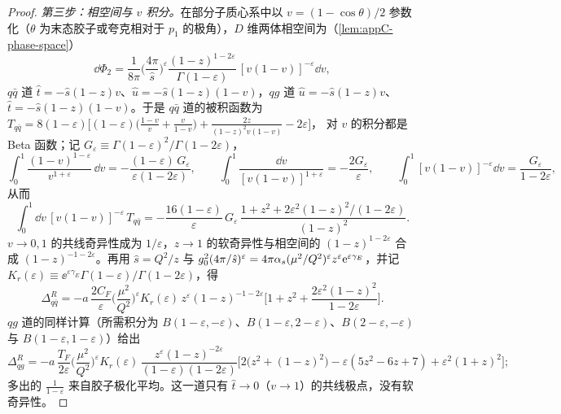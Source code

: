 \begin{proof}
\emph{第三步：相空间与 $v$ 积分。}在部分子质心系中以 $v=(1-\cos\theta)/2$ 参数化（$\theta$ 为末态胶子或夸克相对于 $p_1$ 的极角），$D$ 维两体相空间为（\cref{lem:appC-phase-space}）
\[
\dd\Phi_2=\frac{1}{8\pi}\Big(\frac{4\pi}{\hat s}\Big)^{\varepsilon}\frac{(1-z)^{1-2\varepsilon}}{\Gamma(1-\varepsilon)}\,[v(1-v)]^{-\varepsilon}\dd v,
\]
$q\bar q$ 道 $\hat t=-\hat s(1-z)v$、$\hat u=-\hat s(1-z)(1-v)$，$qg$ 道 $\hat u=-\hat s(1-z)v$、$\hat t=-\hat s(1-z)(1-v)$。于是 $q\bar q$ 道的被积函数为
$T_{q\bar q}=8(1-\varepsilon)\big[(1-\varepsilon)\big(\frac{1-v}{v}+\frac{v}{1-v}\big)+\frac{2z}{(1-z)^2v(1-v)}-2\varepsilon\big]$，
对 $v$ 的积分都是 Beta 函数；记 $G_\varepsilon\equiv\Gamma(1-\varepsilon)^2/\Gamma(1-2\varepsilon)$，
\[
\int_0^1\!\frac{(1-v)^{1-\varepsilon}}{v^{1+\varepsilon}}\,\dd v=-\frac{(1-\varepsilon)\,G_\varepsilon}{\varepsilon(1-2\varepsilon)},\qquad
\int_0^1\!\frac{\dd v}{[v(1-v)]^{1+\varepsilon}}=-\frac{2G_\varepsilon}{\varepsilon},\qquad
\int_0^1\![v(1-v)]^{-\varepsilon}\dd v=\frac{G_\varepsilon}{1-2\varepsilon},
\]
从而
\[
\int_0^1\!\dd v\,[v(1-v)]^{-\varepsilon}\,T_{q\bar q}=-\frac{16(1-\varepsilon)}{\varepsilon}\,G_\varepsilon\,\frac{1+z^2+2\varepsilon^2(1-z)^2/(1-2\varepsilon)}{(1-z)^2}.
\]
$v\to0,1$ 的共线奇异性成为 $1/\varepsilon$，$z\to1$ 的软奇异性与相空间的 $(1-z)^{1-2\varepsilon}$ 合成 $(1-z)^{-1-2\varepsilon}$。再用 $\hat s=Q^2/z$ 与 $g_0^2(4\pi/\hat s)^\varepsilon=4\pi\alpha_s(\mu^2/Q^2)^\varepsilon z^\varepsilon\mathrm{e}^{\varepsilon\gamma_E}$，并记 $K_r(\varepsilon)\equiv\ee^{\varepsilon\gamma_E}\Gamma(1-\varepsilon)/\Gamma(1-2\varepsilon)$，得
\begin{equation}\label{eq:dy-real-qq}
\Delta^R_{q\bar q}=-a\,\frac{2C_F}{\varepsilon}\Big(\frac{\mu^2}{Q^2}\Big)^{\varepsilon}K_r(\varepsilon)\,z^{\varepsilon}(1-z)^{-1-2\varepsilon}\Big[1+z^2+\frac{2\varepsilon^2(1-z)^2}{1-2\varepsilon}\Big].
\end{equation}
$qg$ 道的同样计算（所需积分为 $B(1-\varepsilon,-\varepsilon)$、$B(1-\varepsilon,2-\varepsilon)$、$B(2-\varepsilon,-\varepsilon)$ 与 $B(1-\varepsilon,1-\varepsilon)$）给出
\begin{equation}\label{eq:dy-real-qg}
\Delta^R_{qg}=-a\,\frac{T_F}{2\varepsilon}\Big(\frac{\mu^2}{Q^2}\Big)^{\varepsilon}K_r(\varepsilon)\,\frac{z^{\varepsilon}(1-z)^{-2\varepsilon}}{(1-\varepsilon)(1-2\varepsilon)}\Big[2\big(z^2+(1-z)^2\big)-\varepsilon(5z^2-6z+7)+\varepsilon^2(1+z)^2\Big];
\end{equation}
多出的 $\frac1{1-\varepsilon}$ 来自胶子极化平均。这一道只有 $\hat t\to0$（$v\to1$）的共线极点，没有软奇异性。


\end{proof}
